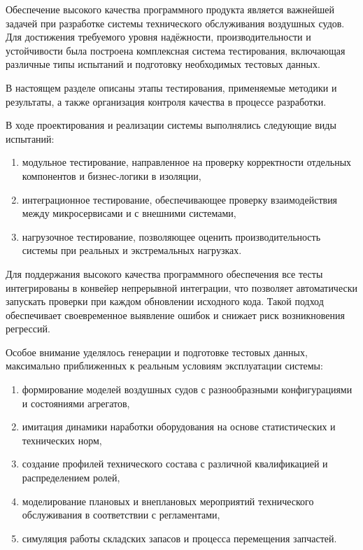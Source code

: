 \documentclass[14pt,a4paper]{extarticle}
\begin{document}
Обеспечение высокого качества программного продукта является важнейшей задачей при разработке системы технического обслуживания воздушных судов. Для достижения требуемого уровня надёжности, производительности и устойчивости была построена комплексная система тестирования, включающая различные типы испытаний и подготовку необходимых тестовых данных.

В настоящем разделе описаны этапы тестирования, применяемые методики и результаты, а также организация контроля качества в процессе разработки.

В ходе проектирования и реализации системы выполнялись следующие виды испытаний:

\begin{enumerate}[label=\alph*)]
\item модульное тестирование, направленное на проверку корректности отдельных компонентов и бизнес-логики в изоляции,

\item интеграционное тестирование, обеспечивающее проверку взаимодействия между микросервисами и с внешними системами,

\item нагрузочное тестирование, позволяющее оценить производительность системы при реальных и экстремальных нагрузках.
\end{enumerate}

Для поддержания высокого качества программного обеспечения все тесты интегрированы в конвейер непрерывной интеграции, что позволяет автоматически запускать проверки при каждом обновлении исходного кода. Такой подход обеспечивает своевременное выявление ошибок и снижает риск возникновения регрессий.

Особое внимание уделялось генерации и подготовке тестовых данных, максимально приближенных к реальным условиям эксплуатации системы:

\begin{enumerate}[label=\alph*)]
\item формирование моделей воздушных судов с разнообразными конфигурациями и состояниями агрегатов,

\item имитация динамики наработки оборудования на основе статистических и технических норм,

\item создание профилей технического состава с различной квалификацией и распределением ролей,

\item моделирование плановых и внеплановых мероприятий технического обслуживания в соответствии с регламентами,

\item симуляция работы складских запасов и процесса перемещения запчастей.
\end{enumerate}
\end{document}
